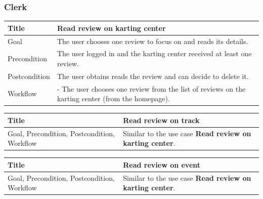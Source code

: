 \documentclass{beamer}
\begin{document}
\begin{frame}
\end{frame}

\begin{frame}
    \frametitle{Clerk}
    \begin{table}
        \tiny
        \begin{tabular}{|p{2cm}|p{6cm}|}
        \hline  
        Title & \textbf{Read review on karting center} \\
        \hline
        Goal & The user chooses one review to focus on and reads its details. \\
        \hline
        Precondition & The user logged in and the karting center received at least one review. \\
        \hline
        Postcondition & The user obtains reads the review and can decide to delete it. \\
        \hline
        Workflow &
        - The user chooses one review from the list of reviews on the karting center (from the homepage). \\
        \hline
        \end{tabular}
    \end{table}

    \begin{table}
        \tiny
        \begin{tabular}{|p{2cm}|p{6cm}|}
        \hline  
        Title & \textbf{Read review on track} \\
        \hline
        Goal, Precondition, Postcondition, Workflow & Similar 
        to the use case \textbf{Read review on karting center}. \\
        \hline
        \end{tabular}
    \end{table}

    \begin{table}
        \tiny
        \begin{tabular}{|p{2cm}|p{6cm}|}
        \hline  
        Title & \textbf{Read review on event} \\
        \hline
        Goal, Precondition, Postcondition, Workflow & Similar 
        to the use case \textbf{Read review on karting center}. \\
        \hline
        \end{tabular}
    \end{table}

\end{frame}
\end{document}
